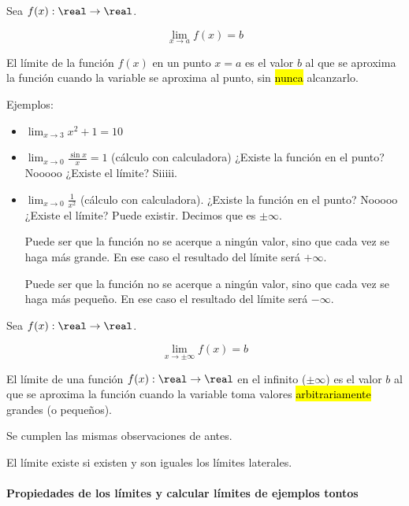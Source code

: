 \documentclass[palatino,nosec]{Docencia}
\begin{document}
\begin{defn}
Sea $f(x):\real\to\real$.

\[\lim_{x\to a} f(x) = b\]

El límite de la función $f(x)$ en un punto $x=a$ es el valor $b$ al que se aproxima la función cuando la variable se aproxima al punto, sin \hl{nunca} alcanzarlo.
\end{defn}

Ejemplos:
\begin{itemize}
	\item $\lim_{x\to 3} x^2 + 1 = 10$
	\item $\lim_{x\to 0} \frac{\sin x}{x} = 1$ (cálculo con calculadora) ¿Existe la función en el punto? Nooooo ¿Existe el límite? Siiiii.
	\item $\lim_{x\to 0} \frac{1}{x^2}$ (cálculo con calculadora). ¿Existe la función en el punto? Nooooo ¿Existe el límite? Puede existir. Decimos que es $\pm\infty$.

\obs Puede ser que la función no se acerque a ningún valor, sino que cada vez se haga más grande. En ese caso el resultado del límite será $+\infty$.

\obs Puede ser que la función no se acerque a ningún valor, sino que cada vez se haga más pequeño. En ese caso el resultado del límite será $-\infty$.
\end{itemize}


\begin{defn}
Sea $f(x):\real\to\real$.

\[\lim_{x\to \pm\infty} f(x) = b\]

El límite de una función $f(x):\real\to\real$ en el infinito ($\pm\infty$) es el valor $b$ al que se aproxima la función cuando la variable toma valores \hl{arbitrariamente} grandes (o pequeños).
\end{defn}

\obs Se cumplen las mismas observaciones de antes.


\begin{defn} 
	El límite existe si existen y son iguales los límites laterales. 
\end{defn}


\paragraph{Propiedades de los límites y calcular límites de ejemplos tontos}


\printindex
\end{document}
